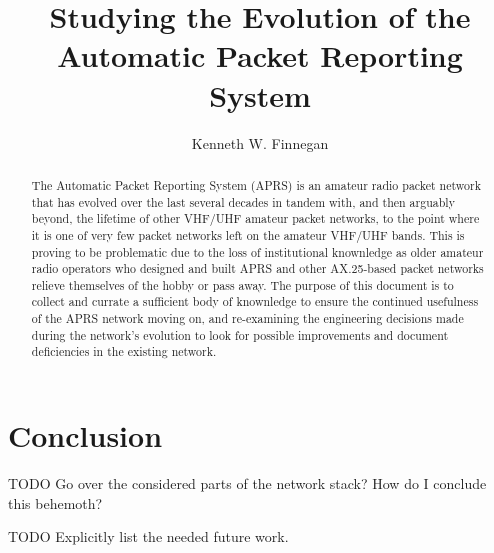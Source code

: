 \documentclass{report}
\begin{document}
\title{Studying the Evolution of the \\
Automatic Packet Reporting System}
\author{Kenneth W. Finnegan}
\maketitle

\begin{abstract}
The Automatic Packet Reporting System (APRS) is an amateur radio packet 
network that has evolved over the last several decades in tandem with, 
and then arguably beyond, the lifetime of other VHF/UHF amateur packet
networks, to the point where it is one of very few packet networks left
on the amateur VHF/UHF bands. This is proving to be problematic due to
the loss of institutional knownledge as older amateur radio operators who
designed and built APRS and other AX.25-based packet networks relieve 
themselves of the hobby or pass away. The purpose of this document is to 
collect and currate a sufficient body of knownledge to ensure the 
continued usefulness of the APRS network moving on, and re-examining 
the engineering decisions made during the network's evolution to look for
possible improvements and document deficiencies in the existing network.
\end{abstract}

\tableofcontents






\chapter{Conclusion}

TODO Go over the considered parts of the network stack? How do I conclude this
behemoth?

TODO Explicitly list the needed future work.




\end{document}
